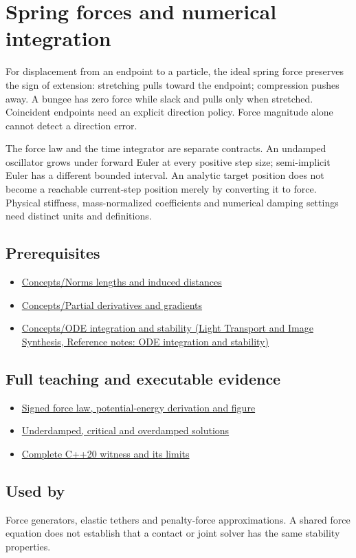 \hypertarget{appendix-e040e2108923}{}\label{referencestart:appendix-e040e2108923}
\section{Spring forces and numerical integration}\label{appendix-e040e2108923-spring-forces-and-numerical-integration}

For displacement from an endpoint to a particle, the ideal spring force preserves the sign of extension: stretching pulls toward the endpoint; compression pushes away. A bungee has zero force while slack and pulls only when stretched. Coincident endpoints need an explicit direction policy. Force magnitude alone cannot detect a direction error.

The force law and the time integrator are separate contracts. An undamped oscillator grows under forward Euler at every positive step size; semi-implicit Euler has a different bounded interval. An analytic target position does not become a reachable current-step position merely by converting it to force. Physical stiffness, mass-normalized coefficients and numerical damping settings need distinct units and definitions.

\subsection{Prerequisites}\label{appendix-e040e2108923-prerequisites}

\begin{itemize}
\tightlist
\item
  \hyperref[appendix-49933872bb51]{Concepts/Norms lengths and induced distances}
\item
  \hyperref[appendix-677b59746ae0]{Concepts/Partial derivatives and gradients}
\item
  \href{../04-Light-Transport-and-Image-Synthesis/main.pdf\#nameddest=appendix-18eacf61a04b}{Concepts/ODE integration and stability (Light Transport and Image Synthesis, Reference notes: ODE integration and stability)}
\end{itemize}

\subsection{Full teaching and executable evidence}\label{appendix-e040e2108923-full-teaching-and-executable-evidence}

\begin{itemize}
\tightlist
\item
  \hyperref[06-engine-ii-ch047-a-spring-law-is-signed-not-just-a-magnitude]{Signed force law, potential-energy derivation and figure}
\item
  \hyperref[06-engine-ii-ch047-solve-each-linear-damping-regime-with-its-own-form]{Underdamped, critical and overdamped solutions}
\item
  \hyperref[06-engine-ii-ch047-standalone-spring-direction-and-integration-order-laboratory]{Complete C++20 witness and its limits}
\end{itemize}

\subsection{Used by}\label{appendix-e040e2108923-used-by}

Force generators, elastic tethers and penalty-force approximations. A shared force equation does not establish that a contact or joint solver has the same stability properties.
